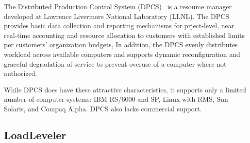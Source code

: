 The Distributed Production Control System (DPCS)~\cite{DPCS}
is a resource manager developed at Lawrence Livermore National Laboratory (LLNL). 
The DPCS provides basic data collection and reporting
mechanisms for prject-level, near real-time accounting and resource allocation
to customers with established limits per customers' organization budgets,
In addition, the DPCS evenly distributes workload across available computers
and supports dynamic reconfiguration and graceful degradation of service to prevent
overuse of a computer where not authorized.

While DPCS does have these attractive characteristics, it supports only a 
limited number of computer systems: IBM RS/6000 and SP, Linux with RMS, 
Sun Solaris, and Compaq Alpha. DPCS also lacks commercial support.

\subsection*{LoadLeveler}


